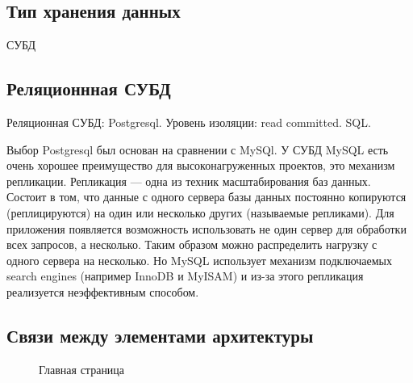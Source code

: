 \documentclass[a4paper]{report}
\begin{document}
\subsection*{Тип хранения данных}
СУБД
\subsection*{Реляционнная СУБД}
Реляционная СУБД: Postgresql. Уровень изоляции: read committed. SQL.

Выбор Postgresql был основан на сравнении с MySQl. У СУБД MySQL есть очень хорошее преимущество для высоконагруженных проектов, это механизм репликации. Репликация — одна из техник масштабирования баз данных. Состоит в том, что данные с одного сервера базы данных постоянно копируются (реплицируются) на один или несколько других (называемые репликами). Для приложения появляется возможность использовать не один сервер для обработки всех запросов, а несколько. Таким образом  можно распределить нагрузку с одного сервера на несколько. Но MySQL использует механизм подключаемых search engines (например InnoDB и MyISAM) и из-за этого репликация реализуется неэффективным способом.
\subsection*{Связи между элементами архитектуры}
\begin{figure}[h!]
  \centering
  \caption{Главная страница}
  \label{third}
\end{figure}
\end{document}
